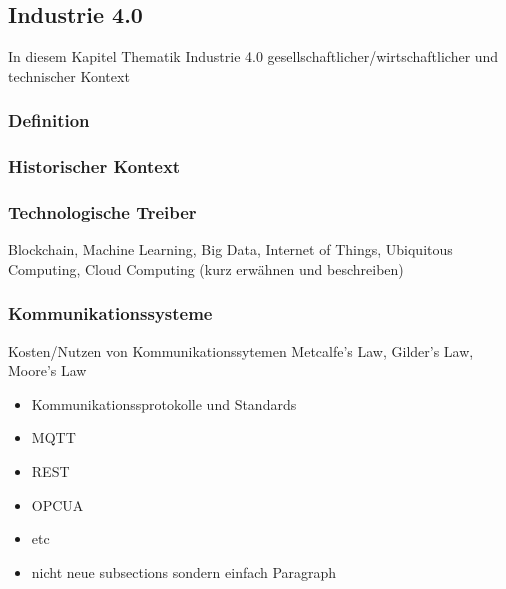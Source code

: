 \subsection{Industrie 4.0}
In diesem Kapitel Thematik Industrie 4.0 gesellschaftlicher/wirtschaftlicher und technischer Kontext
\subsubsection{Definition}
\subsubsection{Historischer Kontext}
\subsubsection{Technologische Treiber}
Blockchain, Machine Learning, Big Data, Internet of Things, Ubiquitous Computing, Cloud Computing (kurz erwähnen und beschreiben)
\subsubsection{Kommunikationssysteme}
Kosten/Nutzen von Kommunikationssytemen
Metcalfe’s Law, Gilder’s Law, Moore’s Law
\begin{itemize}
  \item Kommunikationssprotokolle und Standards
  \item MQTT
  \item REST
  \item OPCUA
  \item etc
  \item nicht neue subsections sondern einfach Paragraph
\end{itemize}
